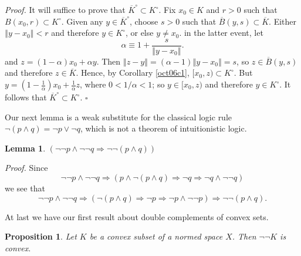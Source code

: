 \documentclass[11pt]{article}%
\newtheorem{lemma}[theorem]{Lemma}
\newtheorem{proposition}[theorem]{Proposition}
\newenvironment{proof}[1][Proof]{\noindent\textit{#1.} }{}
\begin{document}
\begin{proof}
It will suffice to prove that $\overline{K}^{\circ}\subset K^{\circ}$. Fix
$x_{0}\in K$ and $r>0$ such that $B(x_{0},r)\subset K^{\circ}$. Given any
$y\in\overline{K}^{\circ}$, choose $s>0$ such that $\overline{B}%
(y,s)\subset\overline{K}$. Either $\left\Vert y-x_{0}\right\Vert <r$ and
therefore $y\in K^{\circ}$, or else $y\neq x_{0}$. in the latter event, let%
\[
\alpha\equiv1+\frac{s}{\left\Vert y-x_{0}\right\Vert }.
\]
and $z=(1-\alpha)x_{0}+\alpha y$. Then $\left\Vert z-y\right\Vert =\left(
\alpha-1\right)  \left\Vert y-x_{0}\right\Vert =s$, so $z\in\overline
{B}(y,s)\ $and therefore $z\in\overline{K}$. Hence, by Corollary
\ref{oct06c1}, $[x_{0},z)\subset K^{\circ}$. But $y=\left(  1-\frac{1}{\alpha
}\right)  x_{0}+\frac{1}{\alpha}z$, where $0<1/\alpha<1$; so $y\in\lbrack
x_{0},z)$ and therefore $y\in K^{\circ}$. It follows that $\overline{K}%
^{\circ}\subset K^{\circ}$.%
\hfill
$\square$
\end{proof}

%

\medskip
Our next lemma is a weak substitute for the classical logic rule
$\lnot(p\wedge q)=\lnot p\vee\lnot q$, which is not a theorem of
intuitionistic logic.

\begin{lemma}
\label{sept30l1}$(\lnot\lnot p\wedge\lnot\lnot q\Rightarrow\lnot\lnot(p\wedge
q))$
\end{lemma}

\begin{proof}
Since%
\[
\lnot\lnot p\wedge\lnot\lnot q\Rightarrow(p\wedge\lnot(p\wedge q)\Rightarrow
\lnot q\Rightarrow\lnot q\wedge\lnot\lnot q)
\]
we see that%
\begin{equation}
\lnot\lnot p\wedge\lnot\lnot q\Rightarrow(\lnot(p\wedge q)\Rightarrow\lnot
p\Rightarrow\lnot p\wedge\lnot\lnot p)\Rightarrow\lnot\lnot(p\wedge
q).\tag*{$\square$}%
\end{equation}

\end{proof}

At last we have our first result about double complements of convex sets.

\begin{proposition}
\label{sept30p1}Let $K$ be a convex subset of a normed space $X$. Then
$\lnot\lnot K$ is convex.
\end{proposition}
\end{document}
